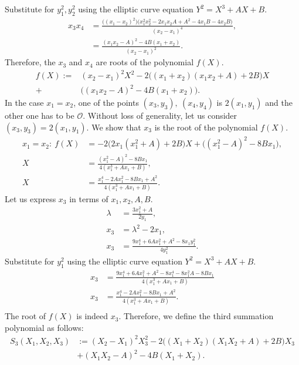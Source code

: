 \documentclass[thesis=M,english]{FITthesis}[2012/10/20]
\theoremstyle{remark}
\theoremstyle{definition}
\begin{document}
\vphantom{.}
Substitute for $y_1^2,y_2^2$ using the elliptic curve equation $Y^2 = X^3 + AX + B.$\\
\vphantom{.}
\begin{align*}
x_3x_4 &= \frac{\bigg((x_1-x_2)^2\bigg)\bigg(x_{1}^{2} x_{2}^{2} - 2 x_{1} x_{2} A + A^{2} - 4 x_{1} B - 4 x_{2} B\bigg)}{(x_2-x_1)^4},\\
&= \frac{(x_1x_2-A)^2 - 4B(x_1+x_2)}{(x_2-x_1)^2}.
\end{align*}
Therefore, the $x_3$ and $x_4$ are roots of the polynomial $f(X)$.
\begin{align*}
f(X) :=& (x_2-x_1)^2X^2-2\bigg((x_1+x_2)(x_1x_2 + A) + 2B\bigg)X \\
+& \bigg((x_1x_2-A)^2 - 4B(x_1+x_2)\bigg).
\end{align*}
In the case $x_1=x_2$, one of the points $(x_3,y_3),\ (x_4,y_4)$ is $2(x_1,y_1)$ and the other one has to be $\mathcal{O}$. Without loss of generality, let us consider $(x_3,y_3) = 2(x_1,y_1)$. We show that $x_3$ is the root of the polynomial $f(X)$.
\begin{align*}
x_1 = x_2:\ f(X) &= -2\bigg(2x_1(x_1^2+A)+2B\bigg)X +\bigg((x_1^2-A)^2-8Bx_1\bigg),
\\ X &= \frac{(x_1^2-A)^2-8Bx_1}{4(x_1^3+Ax_1+B)}, \\ 
	X &= \frac{x_1^4-2Ax_1^2-8Bx_1+A^2}{4(x_1^3+Ax_1+B)}.
\end{align*}
Let us express $x_3$ in terms of $x_1,x_2,A,B$.
\begin{align*}
\lambda &= \frac{3x_1^2+A}{2y_1}, \\
	x_3 &= \lambda^2 -2x_1, \\
	x_3 &= \frac{9 x_{1}^{4} + 6 Ax_{1}^{2} + A^{2} -8x_1y_1^2}{4y_1^2}.
\end{align*}
Substitute for $y_1^2$ using the elliptic curve equation $Y^2 = X^3 + AX + B.$
\begin{align*}
x_3 &= \frac{9 x_{1}^{4} + 6A x_{1}^{2} + A^{2}-8 x_{1}^{4} - 8 x_{1}^{2} A - 8B x_{1}}{4(x_1^3+Ax_1+B)} \\
x_3 &= \frac{x_1^4-2Ax_1^2 - 8Bx_1+ A^2}{4(x_1^3+Ax_1+B)}.\\
\end{align*}
The root of $f(X)$ is indeed $x_3$.
Therefore, we define the third summation polynomial as follows:
\begin{align*}
S_3(X_1,X_2,X_3) &:= (X_2-X_1)^2X_3^2-2\bigg((X_1+X_2)(X_1X_2 + A) + 2B\bigg)X_3\\
&+ (X_1X_2-A)^2 - 4B(X_1+X_2).
\end{align*}
\end{document}
